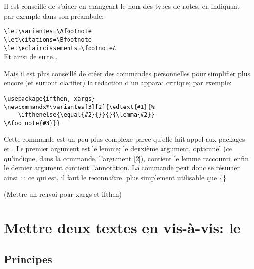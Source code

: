 Il est conseillé de s'aider en changeant le nom des types de notes, en indiquant par exemple dans son préambule: 

\noindent \verb|\let\variantes=\Afootnote| \\
\verb|\let\citations=\Bfootnote| \\
\verb|\let\eclaircissements=\footnoteA| \\
Et ainsi de suite\dots 

Mais il est plus conseillé de créer des commandes personnelles pour simplifier plus encore  (et surtout clarifier) la rédaction d'un apparat critique; par exemple:

\begin{verbatim}
\usepackage{ifthen, xargs}
\newcommandx*\variantes[3][2]{\edtext{#1}{%
	\ifthenelse{\equal{#2}{}}{}{\lemma{#2}}
\Afootnote{#3}}}
\end{verbatim}

Cette commande est un peu plus complexe parce qu'elle fait appel aux packages  et . Le premier argument est le lemme; le deuxième argument, optionnel (ce qu'indique, dans la commande, l'argument [2]), contient le lemme raccourci; enfin le dernier argument contient l'annotation. La commande peut donc se résumer ainsi :  : ce qui est, il faut le reconnaître, plus simplement utilisable que \{\}


(Mettre un renvoi pour xargs et ifthen)

 




\section{Mettre deux textes en vis-à-vis: le }

\subsection{Principes}

